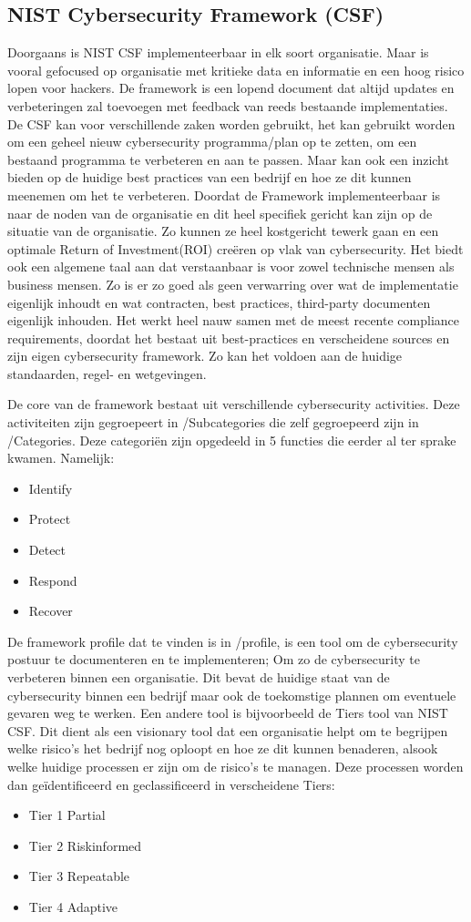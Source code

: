 \subsection{NIST Cybersecurity Framework (CSF)}

Doorgaans is NIST CSF implementeerbaar in elk soort organisatie. Maar is vooral gefocused op organisatie met kritieke data en informatie en een hoog risico lopen voor hackers.
De framework is een lopend document dat altijd updates en verbeteringen zal toevoegen met feedback van reeds bestaande implementaties. \autocite{Calder2018}
De CSF kan voor verschillende zaken worden gebruikt, het kan gebruikt worden om een geheel nieuw cybersecurity programma/plan op te zetten, om een bestaand programma te verbeteren en aan te passen. Maar kan ook een inzicht bieden op de huidige best practices van een bedrijf en hoe ze dit kunnen meenemen om het te verbeteren.
Doordat de Framework implementeerbaar is naar de noden van de organisatie en dit heel specifiek gericht kan zijn op de situatie van de organisatie. Zo kunnen ze heel kostgericht tewerk gaan en een optimale Return of Investment(ROI) creëren op vlak van cybersecurity.
Het biedt ook een algemene taal aan dat verstaanbaar is voor zowel technische mensen als business mensen. Zo is er zo goed als geen verwarring over wat de implementatie eigenlijk inhoudt en wat contracten, best practices, third-party documenten eigenlijk inhouden.
Het werkt heel nauw samen met de meest recente compliance requirements, doordat het bestaat uit best-practices en verscheidene sources en zijn eigen cybersecurity framework. Zo kan het voldoen aan de huidige standaarden, regel- en wetgevingen. \autocite{Calder2018}

De core van de framework bestaat uit verschillende cybersecurity activities. Deze activiteiten zijn gegroepeert in /Subcategories die zelf gegroepeerd zijn in /Categories. Deze categoriën zijn opgedeeld in 5 functies die eerder al ter sprake kwamen.
Namelijk:

\begin{itemize}
    \item Identify
    \item Protect
    \item Detect
    \item Respond
    \item Recover
\end{itemize}

De framework profile dat te vinden is in /profile, is een tool om de cybersecurity postuur te documenteren en te implementeren; Om zo de cybersecurity te verbeteren binnen een organisatie.
Dit bevat de huidige staat van de cybersecurity binnen een bedrijf maar ook de toekomstige plannen om eventuele gevaren weg te werken. \autocite{Sultan2017}
Een andere tool is bijvoorbeeld de Tiers tool van NIST CSF. Dit dient als een visionary tool dat een organisatie helpt om te begrijpen welke risico's het bedrijf nog oploopt en hoe ze dit kunnen benaderen, alsook welke huidige processen er zijn om de risico's te managen.
Deze processen worden dan geïdentificeerd en geclassificeerd in verscheidene Tiers: \autocite{Sultan2017}

\begin{itemize}
    \item Tier 1 Partial
    \item Tier 2 Riskinformed
    \item Tier 3 Repeatable
    \item Tier 4 Adaptive
\end{itemize} 